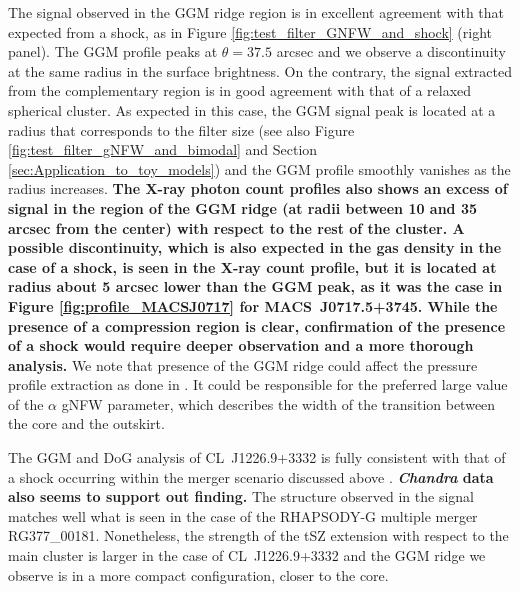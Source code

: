 \documentclass[twocolumn,traditabstract]{aa}
\begin{document}
The signal observed in the GGM ridge region is in excellent agreement with that expected from a shock, as in Figure \ref{fig:test_filter_GNFW_and_shock} (right panel). The GGM profile peaks at $\theta = 37.5$ arcsec and we observe a discontinuity at the same radius in the surface brightness. On the contrary, the signal extracted from the complementary region is in good agreement with that of a relaxed spherical cluster. As expected in this case, the GGM signal peak is located at a radius that corresponds to the filter size (see also Figure \ref{fig:test_filter_gNFW_and_bimodal} and Section \ref{sec:Application_to_toy_models}) and the GGM profile smoothly vanishes as the radius increases. {\bf The X-ray photon count profiles also shows an excess of signal in the region of the GGM ridge (at radii between 10 and 35 arcsec from the center) with respect to the rest of the cluster. A possible discontinuity, which is also expected in the gas density in the case of a shock, is seen in the X-ray count profile, but it is located at radius about 5 arcsec lower than the GGM peak, as it was the case in Figure \ref{fig:profile_MACSJ0717} for \mbox{MACS~J0717.5+3745}. While the presence of a compression region is clear, confirmation of the presence of a shock would require deeper observation and a more thorough analysis.} We note that presence of the GGM ridge could affect the pressure profile extraction as done in \cite{Romero2017}. It could be responsible for the preferred large value of the $\alpha$ gNFW parameter, which describes the width of the transition between the core and the outskirt.

The GGM and DoG analysis of \mbox{CL~J1226.9+3332} is fully consistent with that of a shock occurring within the merger scenario discussed above \citep[see also][for more details]{Adam2015}. {\bf \textit{Chandra} data also seems to support out finding.} The structure observed in the signal matches well what is seen in the case of the RHAPSODY-G multiple merger RG377\_00181. Nonetheless, the strength of the tSZ extension with respect to the main cluster is larger in the case of \mbox{CL~J1226.9+3332} and the GGM ridge we observe is in a more compact configuration, closer to the core.
\end{document}
